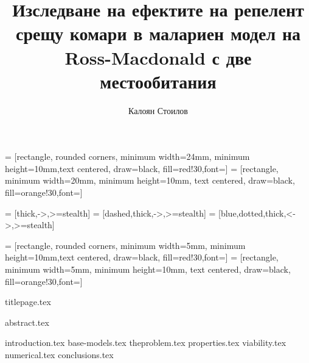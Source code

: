 \documentclass[bulgarian, 12pt]{article}
\title{Изследване на ефектите на репелент срещу комари в малариен модел на Ross-Macdonald с две местообитания}
\author{Калоян Стоилов}
\theoremstyle{definition}
\begin{document}

\usetikzlibrary{shapes,fit}
\tikzset{>=latex}
\usetikzlibrary{shapes.geometric, arrows.meta}

 = [rectangle, rounded corners, minimum width=24mm, minimum height=10mm,text centered, draw=black, fill=red!30,font=\small ]
 = [rectangle, minimum width=20mm, minimum height=10mm, text centered, draw=black, fill=orange!30,font=\small ]

 = [thick,->,>=stealth]
 = [dashed,thick,->,>=stealth]
 = [blue,dotted,thick,<->,>=stealth]

 = [rectangle, rounded corners, minimum width=5mm, minimum height=10mm,text centered, draw=black, fill=red!30,font=\small ]
 = [rectangle, minimum width=5mm, minimum height=10mm, text centered, draw=black, fill=orange!30,font=\small ]

{titlepage.tex}

{abstract.tex}

\tableofcontents
\thispagestyle{empty}
\newpage
\setcounter{page}{1}
{introduction.tex}
{base-models.tex}
{theproblem.tex}
{properties.tex}
{viability.tex}
{numerical.tex}
{conclusions.tex}
\pagebreak
\printbibliography[heading=bibintoc]
% 
% 
\end{document}
